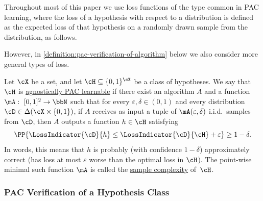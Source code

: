 Throughout most of this paper we use loss functions of the type common in PAC learning, where the loss of a hypothesis with respect to a distribution is defined as the expected loss of that hypothesis on a randomly drawn sample from the distribution, as follows.


However, in \cref{definition:pac-verification-of-algorithm} below we also consider more general types of loss. 

\begin{definition}
	Let $\cX$ be a set, and let $\cH \subseteq \{0,1\}^\cX$ be a class of hypotheses. We say that $\cH$ is \ul{agnostically PAC learnable} if there exist an algorithm $A$ and a function $\mA:~[0,1]^2 \rightarrow \bbN$ such that for every $\varepsilon,\delta \in (0,1)$ and every distribution ${\cD \in \Delta(\cX \times \{0,1\})}$, if $A$ receives as input a tuple of $\mA(\varepsilon,\delta)$ i.i.d.\ samples from $\cD$, then $A$ outputs a function $h \in \cH$ satisfying
	\[
	\PP{\LossIndicator{\cD}{h} \leq \LossIndicator{\cD}{\cH} + \varepsilon} \geq 1-\delta.
	\]
	In words, this means that $h$ is probably (with confidence $1-\delta$) approximately correct (has loss at most $\varepsilon$ worse than the optimal loss in $\cH$). The point-wise minimal such function $\mA$ is called the \ul{sample complexity} of~$\cH$.
\end{definition}

\subsubsection*{PAC Verification of a Hypothesis Class}

